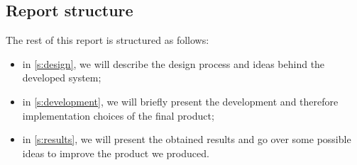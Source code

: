 \documentclass[../../main]{subfiles}
\begin{document}
\label{ss:report-structure}
\subsection{Report structure}

The rest of this report is structured as follows:
\begin{itemize}
    \item in \ref{s:design}, we will describe the design process and ideas behind the developed system;
    \item in \ref{s:development}, we will briefly present the development and therefore implementation choices of the final product;
    \item in \ref{s:results}, we will present the obtained results and go over some possible ideas to improve the product we produced.
\end{itemize}
\end{document}
